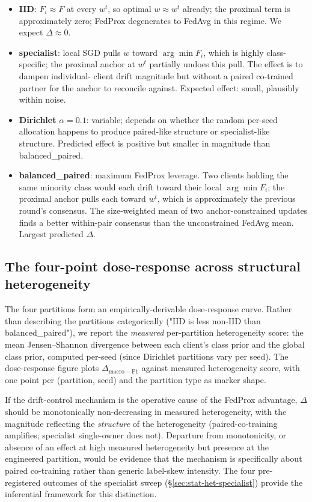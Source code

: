 \begin{itemize}
  \item \textbf{IID}: $F_i \approx F$ at every $w^t$, so optimal
        $w \approx w^t$ already; the proximal term is approximately
        zero; FedProx degenerates to FedAvg in this regime.
        We expect $\Delta \approx 0$.
  \item \textbf{specialist}: local SGD pulls $w$ toward $\arg\min F_i$,
        which is highly class-specific; the proximal anchor at $w^t$
        partially undoes this pull. The effect is to dampen individual-
        client drift magnitude but without a paired co-trained partner
        for the anchor to reconcile against. Expected effect: small,
        plausibly within noise.
  \item \textbf{Dirichlet} $\alpha=0.1$: variable; depends on whether
        the random per-seed allocation happens to produce paired-like
        structure or specialist-like structure. Predicted effect is
        positive but smaller in magnitude than balanced\_paired.
  \item \textbf{balanced\_paired}: maximum FedProx leverage. Two
        clients holding the same minority class would each drift
        toward their local $\arg\min F_i$; the proximal anchor pulls
        each toward $w^t$, which is approximately the previous round's
        consensus. The size-weighted mean of two anchor-constrained
        updates finds a better within-pair consensus than the
        unconstrained FedAvg mean. Largest predicted $\Delta$.
\end{itemize}

\subsection{The four-point dose-response across structural
            heterogeneity}
\label{sec:stat-het-doseresp}

The four partitions form an empirically-derivable dose-response curve.
Rather than describing the partitions categorically ("IID is less
non-IID than balanced\_paired"), we report the
\emph{measured} per-partition heterogeneity score: the mean
Jensen--Shannon divergence between each client's class prior and the
global class prior, computed per-seed (since Dirichlet partitions vary
per seed). The dose-response figure plots
$\Delta_{\mathrm{macro-F1}}$ against measured heterogeneity score,
with one point per (partition, seed) and the partition type as marker
shape.

If the drift-control mechanism is the operative cause of the FedProx
advantage, $\Delta$ should be monotonically non-decreasing in
measured heterogeneity, with the magnitude reflecting the
\emph{structure} of the heterogeneity (paired-co-training amplifies;
specialist single-owner does not). Departure from monotonicity, or
absence of an effect at high measured heterogeneity but presence at
the engineered partition, would be evidence that the mechanism is
specifically about paired co-training rather than generic label-skew
intensity. The four pre-registered outcomes of the specialist
sweep (\S\ref{sec:stat-het-specialist}) provide the inferential
framework for this distinction.

